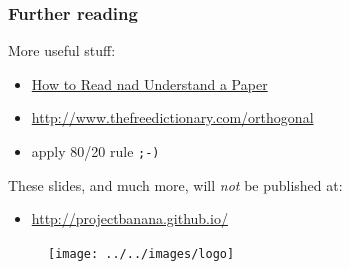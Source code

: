 \documentclass{beamer}
\begin{document}
\begin{frame}
\frametitle{Further reading}
More useful stuff:
\vspace{-0.4cm}
\begin{itemize}
 \item \href{http://eprints.ma.man.ac.uk/2484/01/covered/MIMS_ep2016_36.pdf}{How to Read nad Understand a Paper}
 \item \url{http://www.thefreedictionary.com/orthogonal}
 \item apply 80/20 rule \texttt{;-)}
\end{itemize}

These slides, and much more, will \textit{not} be published at:
\vspace{-0.4cm}
\begin{itemize}
 \item \url{http://projectbanana.github.io/}
\end{itemize}
 \begin{figure}
\centering
 \texttt{[image: ../../images/logo]}
\end{figure}
\end{frame}
\end{document}
